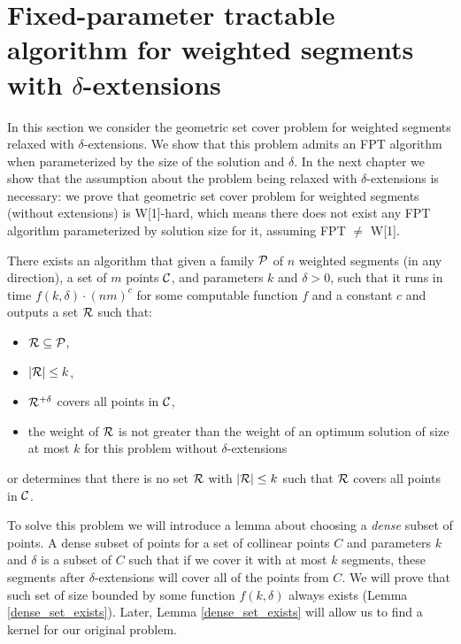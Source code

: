\section{Fixed-parameter tractable algorithm for weighted segments with $\delta$-extensions}
\label{section:fpt_weighted}

In this section we consider the geometric set cover problem
for weighted segments relaxed with $\delta$-extensions.
We show that this problem
admits an FPT algorithm when parameterized by the size
of the solution and $\delta$.
In the next chapter we show that the assumption
about the problem being relaxed with $\delta$-extensions is necessary:
we prove that geometric set cover problem
for weighted segments (without extensions) is W[1]-hard, which means
there does not exist any FPT algorithm parameterized by solution size for it,
assuming FPT $\neq$ W[1].

\begin{tw}{
	\label{fpt_weighted_segment}
	There exists an algorithm that given a family $\mathcal{P}$ of
	$n$ weighted segments (in any direction),
	a set of $m$ points $\mathcal{C}$, and parameters $k$ and $\delta > 0$,
	such that it
	runs in time $f(k, \delta) \cdot (nm)^c$ for some computable function $f$ and a constant $c$ and
	outputs a set $\mathcal{R}$ such that:
	\begin{itemize}
	\item $\mathcal{R} \subseteq \mathcal{P}$,
	\item $|\mathcal{R}| \le k$,
	\item $\mathcal{R}^{+\delta}$ covers all points in $\mathcal{C}$,
	\item the weight of $\mathcal{R}$ is not greater than the weight
	of an optimum solution of size at most $k$
	for this problem without $\delta$-extensions
	\end{itemize}
	or determines that there is no set $\mathcal{R}$ with $|\mathcal{R}| \le k$
	such that $\mathcal{R}$ covers all points in $\mathcal{C}$.
}\end{tw}


To solve this problem we will introduce a lemma about choosing
a \textit{dense} subset of points. A dense subset of points
for a set of collinear points $C$ and parameters $k$ and $\delta$
is a subset of $C$ such that
if we cover it with at most $k$ segments,
these segments after $\delta$-extensions will cover all of the points from $C$.
We will prove that such set 
of size bounded by some function $f(k, \delta)$
always exists (Lemma \ref{dense_set_exists}).
Later, Lemma \ref{dense_set_exists} will allow us to find a kernel
for our original problem.

